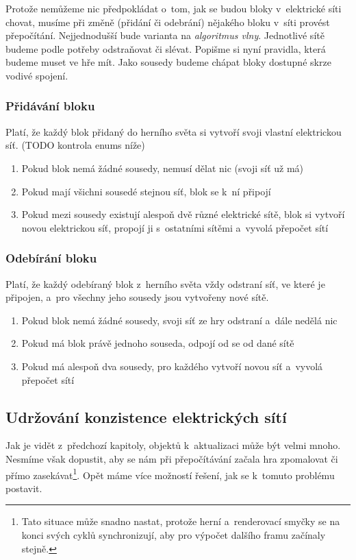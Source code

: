 Protože nemůžeme nic předpokládat o~tom, jak se budou bloky v~elektrické síti chovat, musíme při změně (přidání či odebrání) nějakého bloku v~síti provést přepočítání. Nejjednodušší bude varianta na \textit{algoritmus vlny}. Jednotlivé sítě budeme podle potřeby odstraňovat či slévat. Popišme si nyní pravidla, která budeme muset ve hře mít. Jako sousedy budeme chápat bloky dostupné skrze vodivé spojení.

\subsubsection{Přidávání bloku}
Platí, že každý blok přidaný do herního světa si vytvoří svoji vlastní elektrickou síť.
(TODO kontrola enums níže)
\begin{enumerate}
	\item Pokud blok nemá žádné sousedy, nemusí dělat nic (svoji síť už má)
	\item Pokud mají všichni sousedé stejnou síť, blok se k~ní připojí
	\item Pokud mezi sousedy existují alespoň dvě různé elektrické sítě, blok si vytvoří novou elektrickou síť, propojí ji s~ostatními sítěmi a~vyvolá přepočet sítí
\end{enumerate}

\subsubsection{Odebírání bloku}
Platí, že každý odebíraný blok z~herního světa vždy odstraní síť, ve které je připojen, a~pro všechny jeho sousedy jsou vytvořeny nové sítě.

\begin{enumerate}
	\item Pokud blok nemá žádné sousedy, svoji síť ze hry odstraní a~dále nedělá nic
	\item Pokud má blok právě jednoho souseda, odpojí od se od dané sítě
	\item Pokud má alespoň dva sousedy, pro každého vytvoří novou síť a~vyvolá přepočet sítí
\end{enumerate}

\subsection{Udržování konzistence elektrických sítí}

Jak je vidět z~předchozí kapitoly, objektů k~aktualizaci může být velmi mnoho. Nesmíme však dopustit, aby se nám při přepočítávání začala hra zpomalovat či přímo zasekávat\footnote{Tato situace může snadno nastat, protože herní a~renderovací smyčky se na konci svých cyklů synchronizují, aby pro výpočet dalšího framu začínaly stejně.}. Opět máme více možností řešení, jak se k~tomuto problému postavit. 


